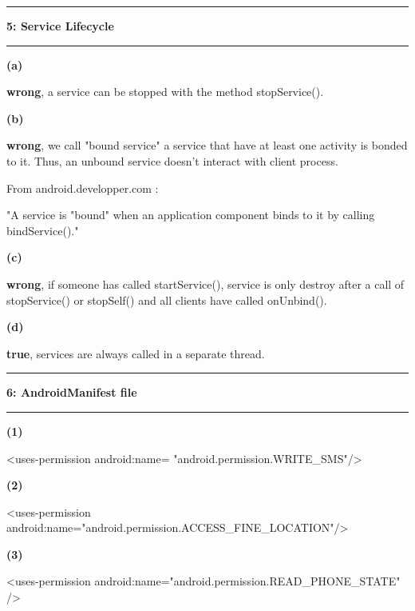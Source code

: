 \documentclass[11pt]{article}
\newcommand\question[2]{\vspace{.25in}\hrule\textbf{#1: #2}\vspace{.5em}\hrule\vspace{.10in}}
\renewcommand\part[1]{\vspace{.10in}\textbf{(#1)}}
\begin{document}
\question{5}{Service Lifecycle} 

\part{a} 

\textbf{wrong}, a service can be stopped with the method stopService().

\part{b}

\textbf{wrong}, we call "bound service" a service that have at least one activity is bonded to it. Thus, an unbound service doesn't interact with client process.

From android.developper.com :

"A service is "bound" when an application component binds to it by calling bindService()."

\part{c}

\textbf{wrong}, if someone has called startService(), service is only destroy after a call of stopService() or stopSelf() and all clients have called onUnbind().

\part{d}

\textbf{true}, services are always called in a separate thread.

\question{6}{AndroidManifest file}

\part{1}

 \textless uses-permission android:name= "android.permission.WRITE\_SMS"/\textgreater 

\part{2}

 \textless uses-permission android:name="android.permission.ACCESS\_FINE\_LOCATION"/\textgreater 

\part{3}

 \textless uses-permission android:name="android.permission.READ\_PHONE\_STATE" /\textgreater 
\end{document}
